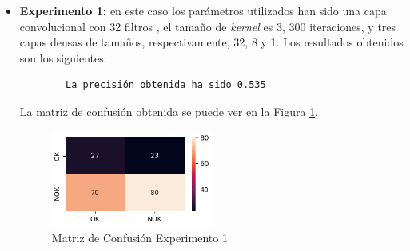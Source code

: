 \begin{itemize}
    \item \textbf{Experimento 1:} en este caso los parámetros utilizados han sido una capa convolucional con 32 filtros , el tamaño de \emph{kernel} es 3, 300 iteraciones, y tres capas densas de tamaños, respectivamente, 32, 8 y 1. Los resultados obtenidos son los siguientes:
    \begin{verbatim}
        La precisión obtenida ha sido 0.535        
    \end{verbatim}
    La matriz de confusión obtenida se puede ver en la Figura \ref{f:exp1}.
    \begin{figure}[h]
     \centering
      \includegraphics[width=0.5\textwidth]{img/exp1.PNG}
     \caption{Matriz de Confusión Experimento 1}
     \label{f:exp1}
    \end{figure}


\end{itemize}
